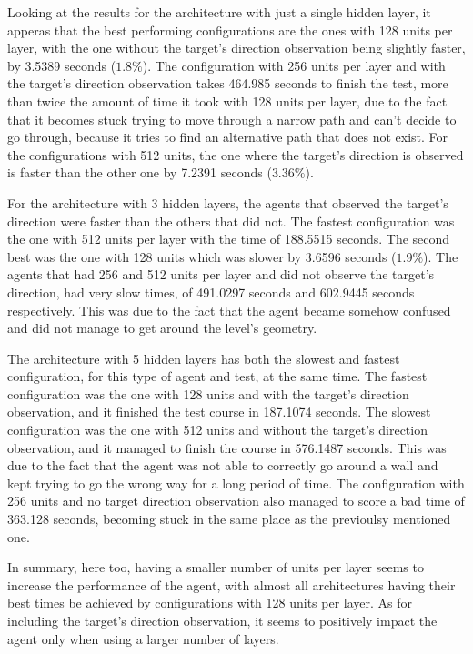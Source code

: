 Looking at the results for the architecture with just a single hidden layer, it apperas that the best performing configurations are the ones with 128 units per layer, with the one without the target's direction observation being slightly faster, by 3.5389 seconds ($1.8\%$). The configuration with 256 units per layer and with the target's direction observation takes 464.985 seconds to finish the test, more than twice the amount of time it took with 128 units per layer, due to the fact that it becomes stuck trying to move through a narrow path and can't decide to go through, because it tries to find an alternative path that does not exist. For the configurations with 512 units, the one where the target's direction is observed is faster than the other one by 7.2391 seconds ($3.36\%$).

For the architecture with 3 hidden layers, the agents that observed the target's direction were faster than the others that did not. The fastest configuration was the one with 512 units per layer with the time of 188.5515 seconds. The second best was the one with 128 units which was slower by 3.6596 seconds ($1.9\%$). The agents that had 256 and 512 units per layer and did not observe the target's direction, had very slow times, of 491.0297 seconds and 602.9445 seconds respectively. This was due to the fact that the agent became somehow confused and did not manage to get around the level's geometry.

The architecture with 5 hidden layers has both the slowest and fastest configuration, for this type of agent and test, at the same time. The fastest configuration was the one with 128 units and with the target's direction observation, and it finished the test course in 187.1074 seconds. The slowest configuration was the one with 512 units and without the target's direction observation, and it managed to finish the course in 576.1487 seconds. This was due to the fact that the agent was not able to correctly go around a wall and kept trying to go the wrong way for a long period of time. The configuration with 256 units and no target direction observation also managed to score a bad time of 363.128 seconds, becoming stuck in the same place as the previoulsy mentioned one.

In summary, here too, having a smaller number of units per layer seems to increase the performance of the agent, with almost all architectures having their best times be achieved by configurations with 128 units per layer. As for including the target's direction observation, it seems to positively impact the agent only when using a larger number of layers.

